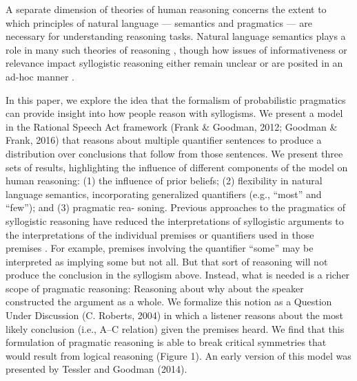 \documentclass[floatsintext, doc]{apa6}
\begin{document}
A separate dimension of theories of human reasoning concerns the extent to which principles of natural language — semantics and pragmatics — are necessary for understanding reasoning tasks. 
Natural language semantics plays a role in many such theories of reasoning \cite{JL1978, Khemlani2012, geurts2003reasoning}, though how issues of informativeness or relevance impact syllogistic reasoning either remain unclear \cite{Roberts2001} or are posited in an ad-hoc manner \cite{Chater1999}. 

In this paper, we explore the idea that the formalism of probabilistic pragmatics can provide insight into how people reason with syllogisms.
We present a model in the Rational Speech Act framework (Frank \& Goodman, 2012; Goodman \& Frank, 2016) that reasons about multiple quantifier sentences to produce a distribution over conclusions that follow from those sentences. We present three sets of results, highlighting the influence of different components of the model on human reasoning: (1) the influence of prior beliefs; (2) flexibility in natural language semantics, incorporating generalized quantifiers (e.g., “most” and “few”); and (3) pragmatic rea- soning. Previous approaches to the pragmatics of syllogistic reasoning have reduced the interpretations of syllogistic arguments to the interpretations of the individual premises or quantifiers used in those premises \cite{Roberts2001}. For example, premises involving the quantifier “some” may be interpreted as implying some but not all. But that sort of reasoning will not produce the conclusion in the syllogism above. Instead, what is needed is a richer scope of pragmatic reasoning: Reasoning about why about the speaker constructed the argument as a whole. We formalize this notion as a Question Under Discussion (C. Roberts, 2004) in which a listener reasons about the most likely conclusion (i.e., A–C relation) given the premises heard. We find that this formulation of pragmatic reasoning is able to break critical symmetries that would result from logical reasoning (Figure 1). An early version of this model was presented by Tessler and Goodman (2014).
\end{document}
